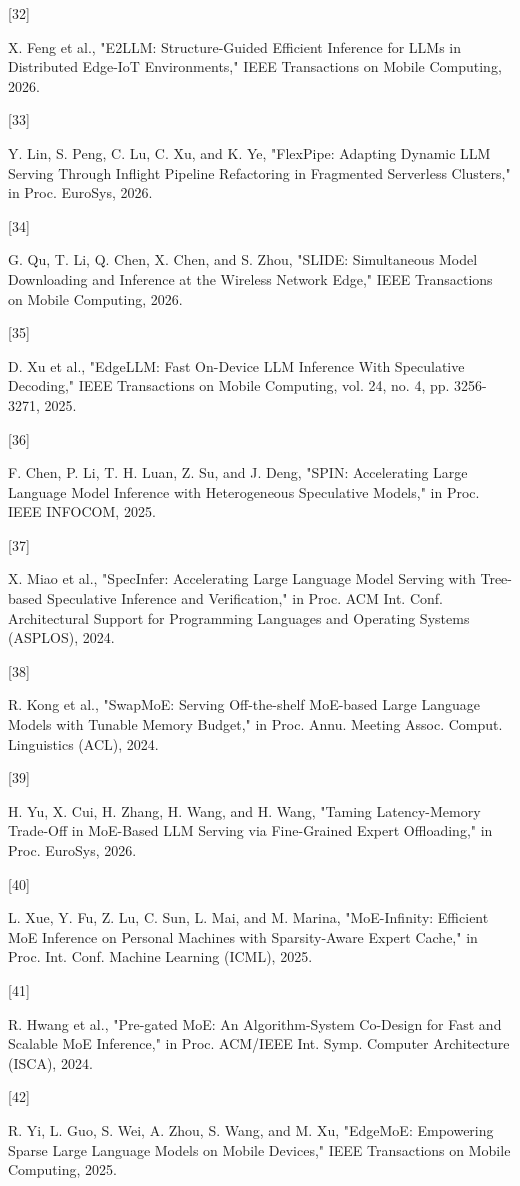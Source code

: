 \hypertarget{ref:32}{[32]} X. Feng et al., "E2LLM: Structure-Guided Efficient Inference for LLMs in Distributed Edge-IoT Environments," IEEE Transactions on Mobile Computing, 2026.

\hypertarget{ref:33}{[33]} Y. Lin, S. Peng, C. Lu, C. Xu, and K. Ye, "FlexPipe: Adapting Dynamic LLM Serving Through Inflight Pipeline Refactoring in Fragmented Serverless Clusters," in Proc. EuroSys, 2026.

\hypertarget{ref:34}{[34]} G. Qu, T. Li, Q. Chen, X. Chen, and S. Zhou, "SLIDE: Simultaneous Model Downloading and Inference at the Wireless Network Edge," IEEE Transactions on Mobile Computing, 2026.

\hypertarget{ref:35}{[35]} D. Xu et al., "EdgeLLM: Fast On-Device LLM Inference With Speculative Decoding," IEEE Transactions on Mobile Computing, vol. 24, no. 4, pp. 3256-3271, 2025.

\hypertarget{ref:36}{[36]} F. Chen, P. Li, T. H. Luan, Z. Su, and J. Deng, "SPIN: Accelerating Large Language Model Inference with Heterogeneous Speculative Models," in Proc. IEEE INFOCOM, 2025.

\hypertarget{ref:37}{[37]} X. Miao et al., "SpecInfer: Accelerating Large Language Model Serving with Tree-based Speculative Inference and Verification," in Proc. ACM Int. Conf. Architectural Support for Programming Languages and Operating Systems (ASPLOS), 2024.

\hypertarget{ref:38}{[38]} R. Kong et al., "SwapMoE: Serving Off-the-shelf MoE-based Large Language Models with Tunable Memory Budget," in Proc. Annu. Meeting Assoc. Comput. Linguistics (ACL), 2024.

\hypertarget{ref:39}{[39]} H. Yu, X. Cui, H. Zhang, H. Wang, and H. Wang, "Taming Latency-Memory Trade-Off in MoE-Based LLM Serving via Fine-Grained Expert Offloading," in Proc. EuroSys, 2026.

\hypertarget{ref:40}{[40]} L. Xue, Y. Fu, Z. Lu, C. Sun, L. Mai, and M. Marina, "MoE-Infinity: Efficient MoE Inference on Personal Machines with Sparsity-Aware Expert Cache," in Proc. Int. Conf. Machine Learning (ICML), 2025.

\hypertarget{ref:41}{[41]} R. Hwang et al., "Pre-gated MoE: An Algorithm-System Co-Design for Fast and Scalable MoE Inference," in Proc. ACM/IEEE Int. Symp. Computer Architecture (ISCA), 2024.

\hypertarget{ref:42}{[42]} R. Yi, L. Guo, S. Wei, A. Zhou, S. Wang, and M. Xu, "EdgeMoE: Empowering Sparse Large Language Models on Mobile Devices," IEEE Transactions on Mobile Computing, 2025.

